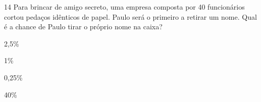 















\num{14} Para brincar de amigo secreto, uma empresa composta por 40
funcionários cortou pedaços idênticos de papel. Paulo será o primeiro a
retirar um nome. Qual é a chance de Paulo tirar o próprio nome na caixa?

\begin{multicols}{2}
\begin{escolha}
\item 2,5\%
\item 1\%
\item 0,25\%
\item 40\%
\end{escolha}
\end{multicols}


